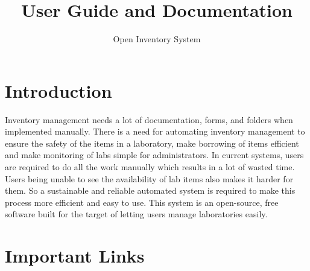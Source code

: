 \documentclass[12pt,a4paper]{article}
\title{User Guide and Documentation}
\author{Open Inventory System}
\begin{document}

\maketitle

\section{Introduction}

Inventory management needs a lot of documentation, forms, and folders when implemented manually. There is a need for automating inventory management to ensure the safety of the items in a laboratory, make borrowing of items efficient and make monitoring of labs simple for administrators. In current systems, users are required to do all the work manually which results in a lot of wasted time. Users being unable to see the availability of lab items also makes it harder for them. So a sustainable and reliable automated system is required to make this process more efficient and easy to use. This system is an open-source, free software built for the target of letting users manage laboratories easily.

\section{Important Links}
\end{document}

